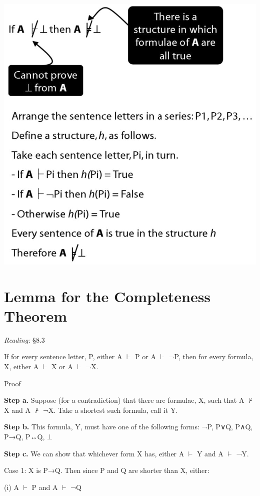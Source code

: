\documentclass[12pt]{extarticle}
\begin{document}
\begin{multicols*}{3}
\begin{center}
\includegraphics[scale=0.3]{img/unit_450.png}
\end{center}
 
 
\section{Lemma for the Completeness Theorem}
 
\emph{Reading:} §8.3
 
 
If for every sentence letter, P, either A $\vdash$ P or A $\vdash$ ¬P, then for every formula, X, either A $\vdash$ X or A $\vdash$ ¬X.
 
Proof
 
\textbf{Step a.} Suppose (for a contradiction) that there are formulae, X, such that A $\nvdash$ X and A $\nvdash$ ¬X. Take a shortest such formula, call it Y.
 
\textbf{Step b.} This formula, Y, must have one of the following forms: ¬P, P∨Q, P∧Q, P→Q, P↔Q, $\bot$
 
\textbf{Step c.} We can show that whichever form X has, either A $\vdash$ Y and A $\vdash$ ¬Y.
 
Case 1: X is P→Q. Then since P and Q are shorter than X, either:
 
\hspace{5mm} (i) A $\vdash$ P and A $\vdash$ ¬Q
 

\end{multicols*}
\end{document}
